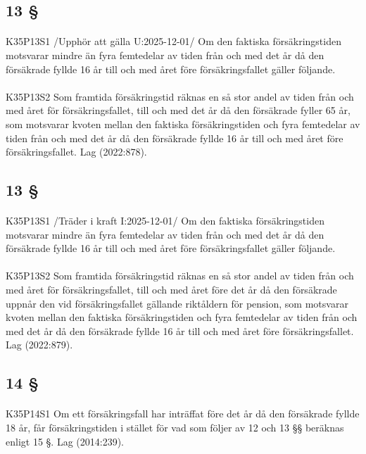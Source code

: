 \documentclass[a4paper,notitlepage,openany,10pt]{book}
\begin{document}
\subsection*{13 §}
\paragraph*{}
{\tiny K35P13S1}
/Upphör att gälla U:2025-12-01/
Om den faktiska försäkringstiden motsvarar mindre än fyra femtedelar av tiden från och med det år då den försäkrade fyllde 16 år till och med året före försäkringsfallet gäller följande.
\paragraph*{}
{\tiny K35P13S2}
Som framtida försäkringstid räknas en så stor andel av tiden från och med året för försäkringsfallet, till och med det år då den försäkrade fyller 65 år, som motsvarar kvoten mellan den faktiska försäkringstiden och fyra femtedelar av tiden från och med det år då den försäkrade fyllde 16 år till och med året före försäkringsfallet.
Lag (2022:878).
\subsection*{13 §}
\paragraph*{}
{\tiny K35P13S1}
/Träder i kraft I:2025-12-01/
Om den faktiska försäkringstiden motsvarar mindre än fyra femtedelar av tiden från och med det år då den försäkrade fyllde 16 år till och med året före försäkringsfallet gäller följande.
\paragraph*{}
{\tiny K35P13S2}
Som framtida försäkringstid räknas en så stor andel av tiden från och med året för försäkringsfallet, till och med året före det år då den försäkrade uppnår den vid försäkringsfallet gällande riktåldern för pension, som motsvarar kvoten mellan den faktiska försäkringstiden och fyra femtedelar av tiden från och med det år då den försäkrade fyllde 16 år till och med året före försäkringsfallet.
Lag (2022:879).
\subsection*{14 §}
\paragraph*{}
{\tiny K35P14S1}
Om ett försäkringsfall har inträffat före det år då den försäkrade fyllde 18 år, får försäkringstiden i stället för vad som följer av 12 och 13 §§ beräknas enligt 15 §.
Lag (2014:239).
\end{document}
